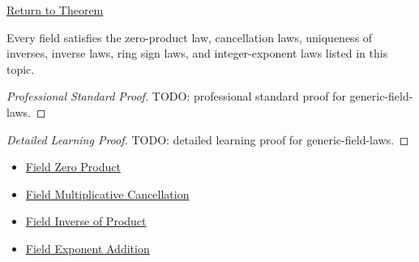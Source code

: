 \newpage
{}
\label{prf:generic-field-laws}

\begin{remark*}[Return]
\hyperref[cor:generic-field-laws]{Return to Theorem}
\end{remark*}

\begin{corollary*}
Every field satisfies the zero-product law, cancellation laws, uniqueness of
inverses, inverse laws, ring sign laws, and integer-exponent laws listed in
this topic.
\end{corollary*}

\begin{proof}[Professional Standard Proof]
\LRAProofBodyStart
TODO: professional standard proof for generic-field-laws.
\end{proof}

\begin{proof}[Detailed Learning Proof]
\LRAProofBodyStart
TODO: detailed learning proof for generic-field-laws.
\end{proof}

\begin{remark*}
\end{remark*}

\begin{dependencies}
\begin{itemize}
  \item \hyperref[def:zero-divisor]{Field Zero Product}
  \item \hyperref[thm:field-multiplicative-cancellation]{Field Multiplicative Cancellation}
  \item \hyperref[thm:field-inverse-of-product]{Field Inverse of Product}
  \item \hyperref[def:integer-power-on-q]{Field Exponent Addition}
\end{itemize}
\end{dependencies}

\clearpage
